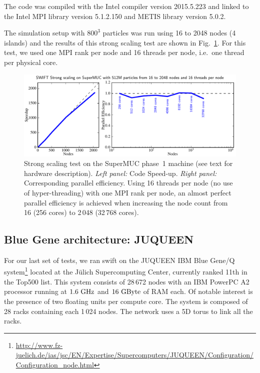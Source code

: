 \documentclass{sig-alternate-05-2015}
\newcommand{\swift}{{\sc swift}\xspace}
\begin{document}
The code was compiled with the Intel compiler version \textsc{2015.5.223} and
linked to the Intel MPI library version \textsc{5.1.2.150} and METIS library
version \textsc{5.0.2}.

The simulation setup with $800^3$ particles was run using 16 to
2048 nodes (4 islands) and the results of this strong scaling test are shown in
Fig.~\ref{fig:superMUC}. For this test, we used one MPI rank per node and 16
threads per node, i.e.~one thread per physical core.

\begin{figure}
\centering
\includegraphics[width=\textwidth]{Figures/scalingSuperMUC}
\caption{Strong scaling test on the SuperMUC phase~1 machine (see text
  for hardware description). \textit{Left panel:} Code
  Speed-up. \textit{Right panel:} Corresponding parallel efficiency.
  Using 16 threads per node (no use of hyper-threading) with one MPI rank
  per node, an almost perfect parallel efficiency is achieved when
  increasing the node count from 16 (256 cores) to 2\,048 (32\,768
  cores).
  \label{fig:superMUC}}
\end{figure}


\subsection{Blue Gene architecture: JUQUEEN}

For our last set of tests, we ran \swift on the JUQUEEN IBM Blue Gene/Q
system\footnote{\url{http://www.fz-juelich.de/ias/jsc/EN/Expertise/Supercomputers/JUQUEEN/Configuration/Configuration_node.html}}
located at the J\"ulich Supercomputing Center,
currently ranked 11th in the Top500 list.
This system consists of
28\,672 nodes with an IBM PowerPC A2 processor running at
$1.6~\rm{GHz}$ and $16~\rm{GByte}$ of RAM each. Of notable interest
is the presence of two floating units per compute core. The system is
composed of 28 racks containing each 1\,024 nodes. The network uses a
5D torus to link all the racks.
\end{document}
